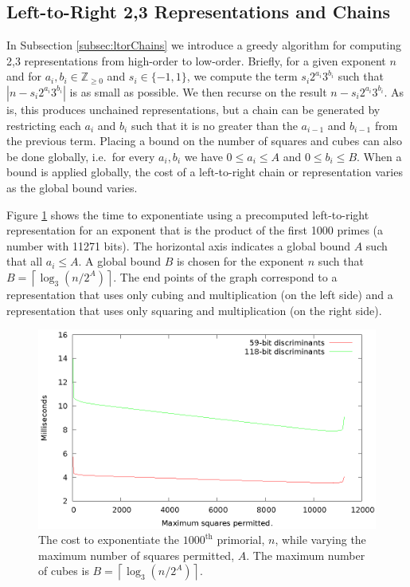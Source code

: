 \documentclass{ucalgthes1}
\theoremstyle{definition}
\newcommand{\ZZgez}{\mathbb{Z}_{\ge 0}}
\newcommand{\ceil}[1]{\left\lceil #1 \right\rceil}
\begin{document}
\subsection{Left-to-Right 2,3 Representations and Chains}
\label{subsec:ltorChains2}

In Subsection \ref{subsec:ltorChains} we introduce a greedy algorithm for computing 2,3 representations from high-order to low-order.  Briefly, for a given exponent $n$ and for $a_i, b_i \in \ZZgez$ and \mbox{$s_i \in \{-1, 1\}$}, we compute the term $s_i2^{a_i}3^{b_i}$ such that $\left|n-s_i2^{a_i}3^{b_i}\right|$ is as small as possible.  We then recurse on the result $n - s_i2^{a_i}3^{b_i}$.  As is, this produces unchained representations, but a chain can be generated by restricting each $a_i$ and $b_i$ such that it is no greater than the $a_{i-1}$ and $b_{i-1}$ from the previous term.  Placing a bound on the number of squares and cubes can also be done globally, i.e.\ for every $a_i, b_i$ we have $0 \le a_i \le A$ and $0 \le b_i \le B$. When a bound is applied globally, the cost of a left-to-right chain or representation varies as the global bound varies.

Figure \ref{fig:dbnsL2rVaryBounds} shows the time to exponentiate using a precomputed left-to-right representation for an exponent that is the product of the first 1000 primes (a number with 11271 bits).  The horizontal axis indicates a global bound $A$ such that all $a_i \le A$.  A global bound $B$ is chosen for the exponent $n$ such that $B = \ceil{\log_3(n/2^A)}$.  The end points of the graph correspond to a representation that uses only cubing and multiplication (on the left side) and a representation that uses only squaring and multiplication (on the right side).

\begin{figure}[H]
\centering
\includegraphics{dbns_l2r_vary_max}
\caption{The cost to exponentiate the $1000^{\textrm{th}}$ primorial, $n$, while varying the maximum number of squares permitted, $A$. The maximum number of cubes is $B = \ceil{\log_3(n/2^A)}$.}
\label{fig:dbnsL2rVaryBounds}
\end{figure}
\end{document}
